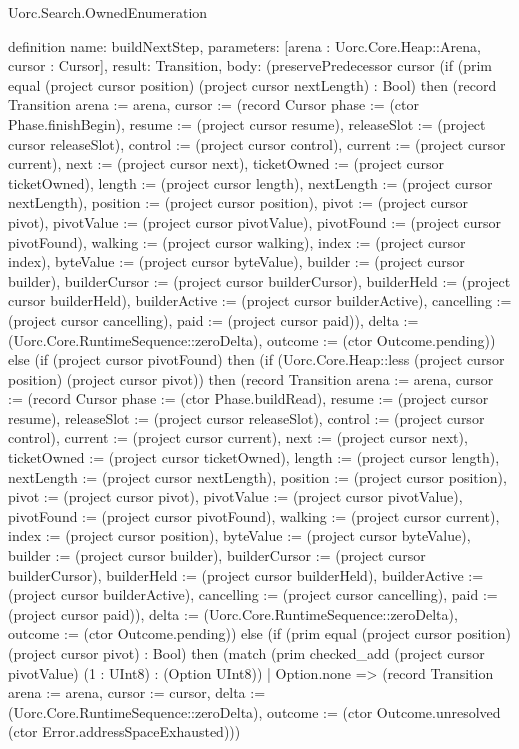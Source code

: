 \begin{lexlean}{Uorc.Search.OwnedEnumeration}
\begin{semanticmodule}
definition{
  name: buildNextStep,
  parameters: [arena : Uorc.Core.Heap::Arena, cursor : Cursor],
  result: Transition,
  body: (preservePredecessor cursor (if (prim equal (project cursor position) (project cursor nextLength) : Bool) then (record Transition {arena := arena, cursor := (record Cursor {phase := (ctor Phase.finishBegin), resume := (project cursor resume), releaseSlot := (project cursor releaseSlot), control := (project cursor control), current := (project cursor current), next := (project cursor next), ticketOwned := (project cursor ticketOwned), length := (project cursor length), nextLength := (project cursor nextLength), position := (project cursor position), pivot := (project cursor pivot), pivotValue := (project cursor pivotValue), pivotFound := (project cursor pivotFound), walking := (project cursor walking), index := (project cursor index), byteValue := (project cursor byteValue), builder := (project cursor builder), builderCursor := (project cursor builderCursor), builderHeld := (project cursor builderHeld), builderActive := (project cursor builderActive), cancelling := (project cursor cancelling), paid := (project cursor paid)}), delta := (Uorc.Core.RuntimeSequence::zeroDelta), outcome := (ctor Outcome.pending)}) else (if (project cursor pivotFound) then (if (Uorc.Core.Heap::less (project cursor position) (project cursor pivot)) then (record Transition {arena := arena, cursor := (record Cursor {phase := (ctor Phase.buildRead), resume := (project cursor resume), releaseSlot := (project cursor releaseSlot), control := (project cursor control), current := (project cursor current), next := (project cursor next), ticketOwned := (project cursor ticketOwned), length := (project cursor length), nextLength := (project cursor nextLength), position := (project cursor position), pivot := (project cursor pivot), pivotValue := (project cursor pivotValue), pivotFound := (project cursor pivotFound), walking := (project cursor current), index := (project cursor position), byteValue := (project cursor byteValue), builder := (project cursor builder), builderCursor := (project cursor builderCursor), builderHeld := (project cursor builderHeld), builderActive := (project cursor builderActive), cancelling := (project cursor cancelling), paid := (project cursor paid)}), delta := (Uorc.Core.RuntimeSequence::zeroDelta), outcome := (ctor Outcome.pending)}) else (if (prim equal (project cursor position) (project cursor pivot) : Bool) then (match (prim checked_add (project cursor pivotValue) (1 : UInt8) : (Option UInt8))
    | Option.none => (record Transition {arena := arena, cursor := cursor, delta := (Uorc.Core.RuntimeSequence::zeroDelta), outcome := (ctor Outcome.unresolved (ctor Error.addressSpaceExhausted))})
}
\end{semanticmodule}
\end{lexlean}
